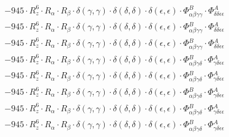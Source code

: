 \documentclass{article}
\begin{document}
\begin{subequations}
\begin{gather}
\begin{array}{c}
 \\[0.2em] 		 - 945 \cdot R_{z}^{6} \cdot R_{\alpha{}} \cdot R_{\beta{}} \cdot \delta{}\left(\gamma{}, \gamma{}\right) \cdot \delta{}\left(\delta{}, \delta{}\right) \cdot \delta{}\left(\epsilon{}, \epsilon{}\right) \cdot \Phi{}^{B}_{\alpha{}\beta{}\gamma{}\gamma{}} \cdot \Phi{}^{A}_{\delta{}\delta{}\epsilon{}\epsilon{}} 
 \\[0.2em] 		 - 945 \cdot R_{z}^{6} \cdot R_{\alpha{}} \cdot R_{\beta{}} \cdot \delta{}\left(\gamma{}, \gamma{}\right) \cdot \delta{}\left(\delta{}, \delta{}\right) \cdot \delta{}\left(\epsilon{}, \epsilon{}\right) \cdot \Phi{}^{B}_{\alpha{}\beta{}\gamma{}\gamma{}} \cdot \Phi{}^{A}_{\delta{}\delta{}\epsilon{}\epsilon{}} 
 \\[0.2em] 		 - 945 \cdot R_{z}^{6} \cdot R_{\alpha{}} \cdot R_{\beta{}} \cdot \delta{}\left(\gamma{}, \gamma{}\right) \cdot \delta{}\left(\delta{}, \delta{}\right) \cdot \delta{}\left(\epsilon{}, \epsilon{}\right) \cdot \Phi{}^{B}_{\alpha{}\beta{}\gamma{}\gamma{}} \cdot \Phi{}^{A}_{\delta{}\delta{}\epsilon{}\epsilon{}} 
 \\[0.2em] 		 - 945 \cdot R_{z}^{6} \cdot R_{\alpha{}} \cdot R_{\beta{}} \cdot \delta{}\left(\gamma{}, \gamma{}\right) \cdot \delta{}\left(\delta{}, \delta{}\right) \cdot \delta{}\left(\epsilon{}, \epsilon{}\right) \cdot \Phi{}^{B}_{\alpha{}\beta{}\gamma{}\delta{}} \cdot \Phi{}^{A}_{\gamma{}\delta{}\epsilon{}\epsilon{}} 
 \\[0.2em] 		 - 945 \cdot R_{z}^{6} \cdot R_{\alpha{}} \cdot R_{\beta{}} \cdot \delta{}\left(\gamma{}, \gamma{}\right) \cdot \delta{}\left(\delta{}, \delta{}\right) \cdot \delta{}\left(\epsilon{}, \epsilon{}\right) \cdot \Phi{}^{B}_{\alpha{}\beta{}\gamma{}\delta{}} \cdot \Phi{}^{A}_{\gamma{}\delta{}\epsilon{}\epsilon{}} 
 \\[0.2em] 		 - 945 \cdot R_{z}^{6} \cdot R_{\alpha{}} \cdot R_{\beta{}} \cdot \delta{}\left(\gamma{}, \gamma{}\right) \cdot \delta{}\left(\delta{}, \delta{}\right) \cdot \delta{}\left(\epsilon{}, \epsilon{}\right) \cdot \Phi{}^{B}_{\alpha{}\beta{}\gamma{}\delta{}} \cdot \Phi{}^{A}_{\gamma{}\delta{}\epsilon{}\epsilon{}} 
 \\[0.2em] 		 - 945 \cdot R_{z}^{6} \cdot R_{\alpha{}} \cdot R_{\beta{}} \cdot \delta{}\left(\gamma{}, \gamma{}\right) \cdot \delta{}\left(\delta{}, \delta{}\right) \cdot \delta{}\left(\epsilon{}, \epsilon{}\right) \cdot \Phi{}^{B}_{\alpha{}\beta{}\gamma{}\delta{}} \cdot \Phi{}^{A}_{\gamma{}\delta{}\epsilon{}\epsilon{}} 
 \\[0.2em] 		 - 945 \cdot R_{z}^{6} \cdot R_{\alpha{}} \cdot R_{\beta{}} \cdot \delta{}\left(\gamma{}, \gamma{}\right) \cdot \delta{}\left(\delta{}, \delta{}\right) \cdot \delta{}\left(\epsilon{}, \epsilon{}\right) \cdot \Phi{}^{B}_{\alpha{}\beta{}\gamma{}\delta{}} \cdot \Phi{}^{A}_{\gamma{}\delta{}\epsilon{}\epsilon{}} 

\end{array}
\end{gather}
\end{subequations}
\end{document}
